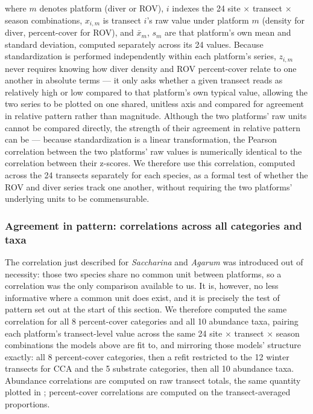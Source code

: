 \documentclass[11pt]{article}
\newcommand{\boxedref}[2]{%
	\begingroup
	\setlength{\fboxrule}{0.8pt}%
	\setlength{\fboxsep}{1.5pt}%
	\textcolor{linkcyan}{%
		\fbox{%
			\textcolor{black}{%
				\hyperref[#2]{#1~\ref*{#2}}%
			}%
		}%
	}%
	\endgroup
}
\newcommand{\figref}[1]{\boxedref{Fig.}{#1}}\newcommand{\tabref}[1]{\boxedref{Table}{#1}}
\begin{document}
\noindent 
where $m$ denotes platform (diver or ROV), $i$ indexes the 24 site $\times$ 
transect $\times$ season combinations, $x_{i,m}$ is transect $i$'s raw value 
under platform $m$ (density for diver, percent-cover for ROV), and $\bar{x}_m$, 
$s_m$ are that platform's own mean and standard deviation, computed separately 
across its 24 values. 
Because standardization is performed independently within each platform's 
series, $z_{i,m}$ never requires knowing how diver density and ROV 
percent-cover relate to one another in absolute terms --- it only asks whether 
a given transect reads as relatively high or low compared to that platform's 
own typical value, allowing the two series to be plotted on one shared,
unitless axis and compared for agreement in relative pattern rather than
magnitude.
Although the two platforms' raw units cannot be compared directly, the
strength of their agreement in relative pattern can be --- because 
standardization is a linear transformation, the Pearson correlation between the 
two platforms' raw values is numerically identical to the correlation between 
their z-scores.
We therefore use this correlation, computed across the 24 transects separately
for each species, as a formal test of whether the ROV and diver series track
one another, without requiring the two platforms' underlying units to be
commensurable.

\subsubsection{Agreement in pattern: correlations across all categories and
taxa}
\label{subsubsec:correlations}

The correlation just described for \textit{Saccharina} and \textit{Agarum} was
introduced out of necessity: those two species share no common unit between
platforms, so a correlation was the only comparison available to us.
It is, however, no less informative where a common unit does exist, and
it is precisely the test of pattern set out at the start of this section.
We therefore computed the same correlation for all 8 percent-cover categories
and all 10 abundance taxa, pairing each platform's transect-level value across
the same 24 site $\times$ transect $\times$ season combinations the models
above are fit to, and mirroring those models' structure exactly: all 8
percent-cover categories, then a refit restricted to the 12 winter transects
for CCA and the 5 substrate categories, then all 10 abundance taxa.
Abundance correlations are computed on raw transect totals, the same quantity
plotted in \figref{fig:abundance_head-to-head}; percent-cover correlations are
computed on the transect-averaged proportions.
\end{document}
